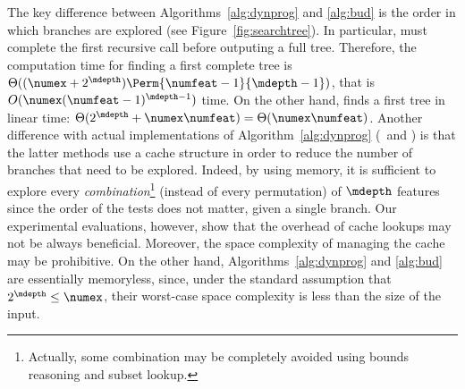 \documentclass{llncs}
\begin{document}
			The key difference between Algorithms~\ref{alg:dynprog} and \ref{alg:bud} is the order in which branches are explored (see Figure~\ref{fig:searchtree}). In particular, \dynprog must complete the first recursive call before outputing a full tree. Therefore, the computation time for finding a first complete tree is $\Theta((\numex+2^{\mdepth})\Perm{\numfeat-1}{\mdepth-1})$, that is $O(\numex(\numfeat-1)^{\mdepth-1})$ time. On the other hand, \budalg finds a first tree in linear time: $\Theta(2^{\mdepth}+\numex\numfeat) = \Theta(\numex\numfeat)$.
			Another difference with actual implementations of Algorithm~\ref{alg:dynprog} (\olddleight\ and \dleight) is that the latter methods use a cache structure in order to reduce the number of branches that need to be explored. Indeed, by using memory, it is sufficient to explore every \emph{combination}\footnote{Actually, some combination may be completely avoided using bounds reasoning and subset lookup.} (instead of every permutation) of $\mdepth$ features since the order of the tests does not matter, given a single branch. Our experimental evaluations, however, show that the overhead of cache lookups may not be always beneficial. Moreover, the space complexity of managing the cache may be prohibitive. On the other hand, Algorithms~\ref{alg:dynprog} and \ref{alg:bud} are essentially memoryless, since, under the standard assumption that $2^{\mdepth} \leq \numex$, their worst-case space complexity is less than the size of the input.
			
			
		
			
			
\end{document}

